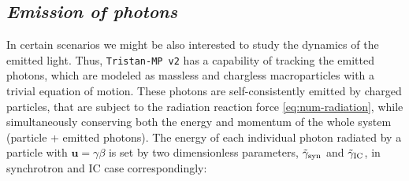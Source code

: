 \begin{figure}[htb]
\end{figure}

\subsection*{\small \it Emission of photons}

In certain scenarios we might be also interested to study the dynamics of the emitted light. Thus, \texttt{Tristan-MP v2} has a capability of tracking the emitted photons, which are modeled as massless and chargless macroparticles with a trivial equation of motion. These photons are self-consistently emitted by charged particles, that are subject to the radiation reaction force \eqref{eq:num-radiation}, while simultaneously conserving both the energy and momentum of the whole system (particle + emitted photons). The energy of each individual photon radiated by a particle with $\bm{u}=\gamma\beta$ is set by two dimensionless parameters, $\tilde{\gamma}_{\rm syn}$ and $\tilde{\gamma}_{\rm IC}$, in synchrotron and IC case correspondingly:

